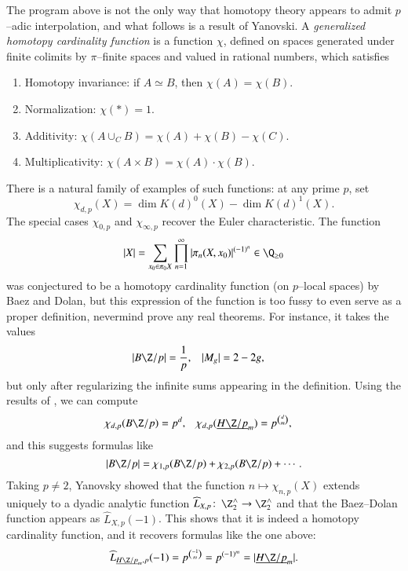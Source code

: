 The program above is not the only way that homotopy theory appears to admit $p$--adic interpolation, and what follows is a result of Yanovski.  A \textit{generalized homotopy cardinality function} is a function $\chi$, defined on spaces generated under finite colimits by $\pi$--finite spaces and valued in rational numbers, which satisfies
\begin{enumerate}
    \item Homotopy invariance: if $A \simeq B$, then $\chi(A) = \chi(B)$.
    \item Normalization: $\chi(*) = 1$.
    \item Additivity: $\chi(A \cup_C B) = \chi(A) + \chi(B) - \chi(C)$.
    \item Multiplicativity: $\chi(A \times B) = \chi(A) \cdot \chi(B)$.
\end{enumerate}
There is a natural family of examples of such functions: at any prime $p$, set \[\chi_{d,p}(X) = \dim K(d)^0(X) - \dim K(d)^1(X).\]  The special cases $\chi_{0, p}$ and $\chi_{\infty, p}$ recover the Euler characteristic.  The function \[|X| = \sum_{x_0 \in \pi_0 X} \prod_{n=1}^\infty |\pi_n (X, x_0)|^{(-1)^n} \in \Q_{\ge 0}\] was conjectured to be a homotopy cardinality function (on $p$--local spaces) by Baez and Dolan, but this expression of the function is too fussy to even serve as a proper definition, nevermind prove any real theorems.  For instance, it takes the values
\begin{align*}
|B\Z/p| & = \frac{1}{p}, &
|M_g| & = 2 - 2g,
\end{align*}
but only after regularizing the infinite sums appearing in the definition.  Using the results of , we can compute
\begin{align*}
\chi_{d,p}(B\Z/p) & = p^d, &
\chi_{d,p}(\OS{H\Z/p}{m}) & = p^{\binom{d}{m}},
\end{align*}
and this suggests formulas like \[|B\Z/p| = \chi_{1,p}(B\Z/p) + \chi_{2,p}(B\Z/p) + \cdots.\]  Taking $p \ne 2$, Yanovsky showed that the function $n \mapsto \chi_{n, p}(X)$ extends uniquely to a dyadic analytic function $\widehat L_{X,p}\co \Z^\wedge_2 \to \Z^\wedge_2$ and that the Baez--Dolan function appears as $\widehat L_{X,p}(-1)$.  This shows that it is indeed a homotopy cardinality function, and it recovers formulas like the one above: \[\widehat L_{\OS{H\Z/p}{m}, p}(-1) = p^{\binom{-1}{m}} = p^{(-1)^m} = |\OS{H\Z/p}{m}|.\]







